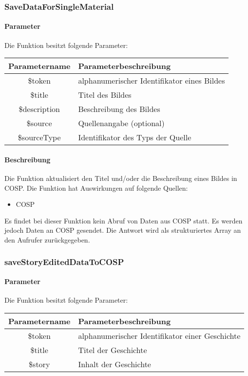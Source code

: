 \subsubsection{SaveDataForSingleMaterial}
\paragraph{Parameter} Die Funktion besitzt folgende Parameter:
\begin{table}[H]
	\begin{tabular}{|c|p{11cm}|}
		\hline
		\textbf{Parametername} & \textbf{Parameterbeschreibung} \\ \hline
		\$token       & alphanumerischer Identifikator eines Bildes \\ \hline
		\$title       & Titel des Bildes \\ \hline
		\$description & Beschreibung des Bildes \\ \hline
		\$source      & Quellenangabe (optional) \\ \hline
		\$sourceType  & Identifikator des Typs der Quelle \\ \hline
	\end{tabular}
\end{table}
\paragraph{Beschreibung} Die Funktion aktualisiert den Titel und/oder die Beschreibung eines Bildes in {\glqq COSP\grqq}. Die Funktion hat Auswirkungen auf folgende Quellen:
\begin{itemize}
	\item COSP
\end{itemize}
Es findet bei dieser Funktion kein Abruf von Daten aus {\glqq COSP\grqq} statt. Es werden jedoch Daten an {\glqq COSP\grqq} gesendet. Die Antwort wird als strukturiertes Array an den Aufrufer zurückgegeben.
\subsubsection{saveStoryEditedDataToCOSP}
\paragraph{Parameter} Die Funktion besitzt folgende Parameter:
\begin{table}[H]
	\begin{tabular}{|c|p{11cm}|}
		\hline
		\textbf{Parametername} & \textbf{Parameterbeschreibung} \\ \hline
		\$token & alphanumerischer Identifikator einer Geschichte \\ \hline
		\$title & Titel der Geschichte \\ \hline
		\$story & Inhalt der Geschichte \\ \hline
	\end{tabular}
\end{table}
